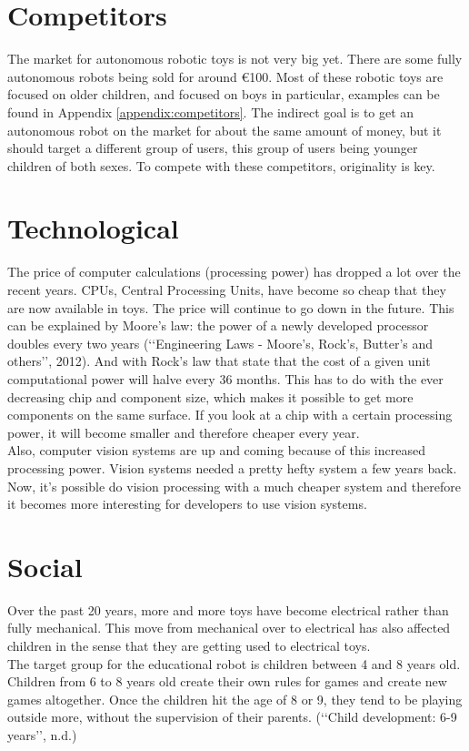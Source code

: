 \documentclass[11pt,twoside,a4paper]{report}
\begin{document}
\section{Competitors}
The market for autonomous robotic toys is not very big yet. There are some fully autonomous robots being sold for around €100. Most of these robotic toys are focused on older children, and focused on boys in particular, examples can be found in Appendix \ref{appendix:competitors}. The indirect goal is to get an autonomous robot on the market for about the same amount of money, but it should target a different group of users, this group of users being younger children of both sexes. To compete with these competitors, originality is key. 
\section{Technological}
The price of computer calculations (processing power) has dropped a lot over the recent years. CPUs, Central Processing Units, have become so cheap that they are now available in toys. The price will continue to go down in the future. This can be explained by Moore\rq{}s law: the power of a newly developed processor doubles every two years (\lq\lq{}Engineering Laws - Moore\rq{}s, Rock\rq{}s, Butter\rq{}s and others\rq\rq{}, 2012). And with Rock\rq{}s law that state that the cost of a given unit computational power will halve every 36 months. This has to do with the ever decreasing chip and component size, which makes it possible to get more components on the same surface. If you look at a chip with a certain processing power, it will become smaller and therefore cheaper every year. \\
Also, computer vision systems are up and coming because of this increased processing power. Vision systems needed a pretty hefty system a few years back. Now, it\rq{}s possible do vision processing with a much cheaper system and therefore it becomes more interesting for developers to use vision systems.
\section{Social}
Over the past 20 years, more and more toys have become electrical rather than fully mechanical. This move from mechanical over to electrical has also affected children in the sense that they are getting used to electrical toys. \\
The target group for the educational robot is children between 4 and 8 years old. Children from 6 to 8 years old create their own rules for games and create new games altogether. Once the children hit the age of 8 or 9, they tend to be playing outside more, without the supervision of their parents. (\lq\lq{}Child development: 6-9 years\rq\rq{}, n.d.)
\end{document}
